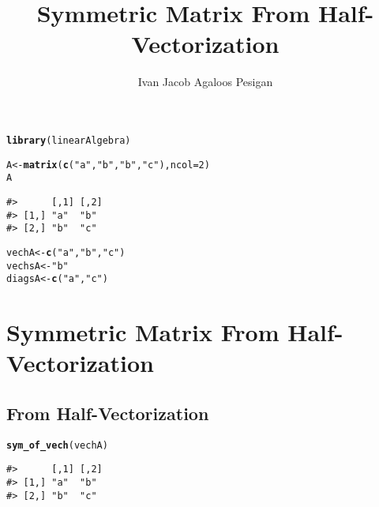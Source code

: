 \documentclass{article}\usepackage[]{graphicx}\usepackage[]{color}
\title{Symmetric Matrix From Half-Vectorization}
\author{Ivan Jacob Agaloos Pesigan}
\date{}
\makeatletter
\newcommand{\hlnum}[1]{\textcolor[rgb]{0.686,0.059,0.569}{#1}}%
\newcommand{\hlstr}[1]{\textcolor[rgb]{0.192,0.494,0.8}{#1}}%
\newcommand{\hlstd}[1]{\textcolor[rgb]{0.345,0.345,0.345}{#1}}%
\newcommand{\hlkwb}[1]{\textcolor[rgb]{0.69,0.353,0.396}{#1}}%
\newcommand{\hlkwc}[1]{\textcolor[rgb]{0.333,0.667,0.333}{#1}}%
\newcommand{\hlkwd}[1]{\textcolor[rgb]{0.737,0.353,0.396}{\textbf{#1}}}%
\newenvironment{kframe}{%
 \def\at@end@of@kframe{}%
 \ifinner\ifhmode%
  \def\at@end@of@kframe{\end{minipage}}%
  \begin{minipage}{\columnwidth}%
 \fi\fi%
 \def\FrameCommand##1{\hskip\@totalleftmargin \hskip-\fboxsep
 \colorbox{shadecolor}{##1}\hskip-\fboxsep
     \hskip-\linewidth \hskip-\@totalleftmargin \hskip\columnwidth}%
 \MakeFramed {\advance\hsize-\width
   \@totalleftmargin\z@ \linewidth\hsize
   \@setminipage}}%
 {\par\unskip\endMakeFramed%
 \at@end@of@kframe}
\newenvironment{knitrout}{}{} %
\makeatother
\begin{document}
\maketitle





\begin{knitrout}
\color{fgcolor}\begin{kframe}
\begin{alltt}
\hlkwd{library}\hlstd{(linearAlgebra)}
\end{alltt}
\end{kframe}
\end{knitrout}

\begin{knitrout}
\color{fgcolor}\begin{kframe}
\begin{alltt}
\hlstd{A} \hlkwb{<-} \hlkwd{matrix}\hlstd{(}\hlkwd{c}\hlstd{(}\hlstr{"a"}\hlstd{,} \hlstr{"b"}\hlstd{,} \hlstr{"b"}\hlstd{,} \hlstr{"c"}\hlstd{),} \hlkwc{ncol} \hlstd{=} \hlnum{2}\hlstd{)}
\hlstd{A}
\end{alltt}
\begin{verbatim}
#>      [,1] [,2]
#> [1,] "a"  "b" 
#> [2,] "b"  "c"
\end{verbatim}
\begin{alltt}
\hlstd{vechA} \hlkwb{<-} \hlkwd{c}\hlstd{(}\hlstr{"a"}\hlstd{,} \hlstr{"b"}\hlstd{,} \hlstr{"c"}\hlstd{)}
\hlstd{vechsA} \hlkwb{<-} \hlstr{"b"}
\hlstd{diagsA} \hlkwb{<-} \hlkwd{c}\hlstd{(}\hlstr{"a"}\hlstd{,} \hlstr{"c"}\hlstd{)}
\end{alltt}
\end{kframe}
\end{knitrout}

\section*{Symmetric Matrix From Half-Vectorization}

\subsection*{From Half-Vectorization}

\begin{knitrout}
\color{fgcolor}\begin{kframe}
\begin{alltt}
\hlkwd{sym_of_vech}\hlstd{(vechA)}
\end{alltt}
\begin{verbatim}
#>      [,1] [,2]
#> [1,] "a"  "b" 
#> [2,] "b"  "c"
\end{verbatim}
\end{kframe}
\end{knitrout}
\end{document}
